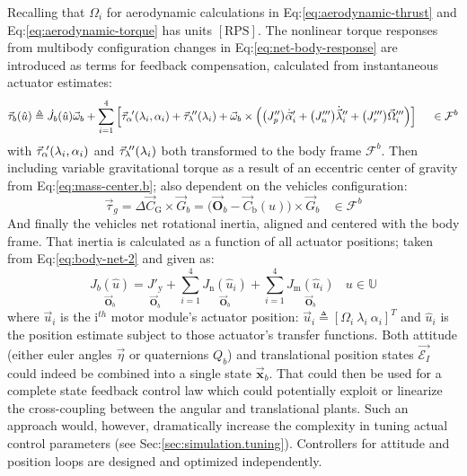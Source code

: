 Recalling that $\Omega_i$ for aerodynamic calculations in Eq:\ref{eq:aerodynamic-thrust} and Eq:\ref{eq:aerodynamic-torque} has units $[\text{RPS}]$. The nonlinear torque responses from multibody configuration changes in Eq:\ref{eq:net-body-response} are introduced as terms for  feedback compensation, calculated from instantaneous actuator estimates:
\begin{equation}\label{eq:actuator-torque}
\vec{\tau}_b(\hat{u})\triangleq\dot{J}_b(\hat{u})\vec{\omega}_b+\sum_{i=1}^{4}\Big[\vec{\tau}_\alpha\hspace{-1pt}'(\lambda_i,\alpha_i)+\vec{\tau}_\lambda\hspace{-2pt}''(\lambda_i)+\vec{\omega}_b\times\Big(\big(J_p''\big)\dot{\vec{\alpha}}_i'+\big(J_n'''\big)\dot{\vec{\lambda}}_i''+\big(J_r'''\big)\vec{\Omega}_i'''\Big)\Big]~~~~\in\mathcal{F}^b
\end{equation}
with $\vec{\tau}_\alpha\hspace{-2pt}'(\lambda_i,\alpha_i)$ and $\vec{\tau}_\lambda\hspace{-2pt}''(\lambda_i)$ both transformed to the body frame $\mathcal{F}^b$. Then including variable gravitational torque as a result of an eccentric center of gravity from Eq:\ref{eq:mass-center.b}; also dependent on the vehicles configuration:
\begin{equation}\label{eq:consolidated-grav-torque}
\vec{\tau}_g=\Delta \vec{C}_\text{G} \times\vec{G}_b=\big(\vec{\mathbf{O}}_b-\vec{C}_\text{b}(u)\big)\times\vec{G}_b~~~~\in\mathcal{F}^b
\end{equation}
And finally the vehicles net rotational inertia, aligned and centered with the body frame. That inertia is calculated as a function of all actuator positions; taken from Eq:\ref{eq:body-net-2} and given as:
\begin{equation}
\underset{\vec{\mathbf{O}}_b}{J_b(\hat{u})}=\underset{\vec{\mathbf{O}}_b}{J'_\text{y}}+\sum_{i=1}^{4} \underset{\vec{\mathbf{O}}_b}{J_\text{n}(\hat{u}_i)}+\sum_{i=1}^{4} \underset{\vec{\mathbf{O}}_b}{J_\text{m}(\hat{u}_i)}~~~~u\in\mathbb{U}
\end{equation}
where $\vec{u}_i$ is the $\text{i}^{th}$ motor module's actuator position: $\vec{u}_i\triangleq [\Omega_i~\lambda_i~\alpha_i]^T$ and $\hat{u}_i$ is the position estimate subject to those actuator's transfer functions. Both attitude (either euler angles $\vec{\eta}$ or quaternions $Q_b$) and translational position states $\vec{\mathcal{E}_I}$ could indeed be combined into a single state $\vec{\mathbf{x}}_b$. That could then be used for a complete state feedback control law which could potentially exploit or linearize the cross-coupling between the angular and translational plants. Such an approach would, however, dramatically increase the complexity in tuning actual control parameters (see Sec:\ref{sec:simulation.tuning}). Controllers for attitude and position loops are designed and optimized independently.